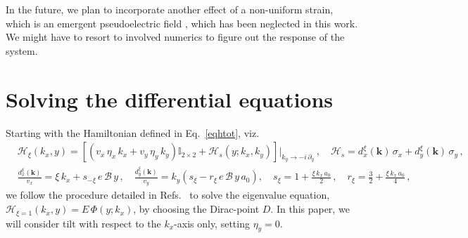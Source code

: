 \documentclass[aps,prb, onecolumn,nofootinbib,citeautoscript,10pt]{revtex4-2}
\newcommand{\bs}[1]{\boldsymbol{#1}}
\def \nn{\nonumber \\}
\begin{document}
In the future, we plan to incorporate another effect of a non-uniform strain, which is an emergent pseudoelectric field \cite{strained-dirac-franz}, which has been neglected in this work. We might have to resort to involved numerics to figure out the response of the system.


\appendix



\section{Solving the differential equations}
\label{appdiff}


Starting with the Hamiltonian defined in Eq.~\eqref{eqhtot}, viz. 
\begin{align}
\label{eqhtotapp}
& \mathcal H_\xi (k_x, y) = \left[ 
\left( v_x \, \eta_x \, k_x + v_y \,\eta_y\, k_y \right)  {\mathbb I}_{2\times 2}
 + \mathcal{H}_s(y; k_x, k_y) \right ]\big \vert_{k_y \rightarrow -i\, \partial_y}
\,, \quad 
\mathcal{H}_s  =   d^\xi_x (\bs k)\,\sigma_x +  d^\xi_y (\bs k)\,\sigma_y  \,, \nn &
\frac{ d^\xi_x(\boldsymbol{k}) } {v_x} = \xi \, k_x + s_{-\xi} \, e \, {\mathcal B} \, y\,,
\quad
\frac {d^\xi_y(\boldsymbol{k})} {v_y} =  k_y  \left(s_\xi - r_\xi \, e \, {\mathcal B} \, y\, a_0
\right )  ,
\quad s_\xi = 1 + \frac{\xi \, k_x\, a_0 } {2}\,, \quad
r_\xi = \frac{3}{2} + \frac{\xi \, k_x\, a_0 } {4} \,,
\end{align}
we follow the procedure detailed in Refs.~\cite{strained-dirac-franz, complex-LL-strained-graphene} to solve the eigenvalue equation, $\mathcal H_{\xi=1} (k_x, y) = E\, \Phi (y; k_x)$, by choosing the Dirac-point $D$. In this paper, we will consider tilt with respect to the $k_x$-axis only, setting $\eta_y = 0 $.
\end{document}
